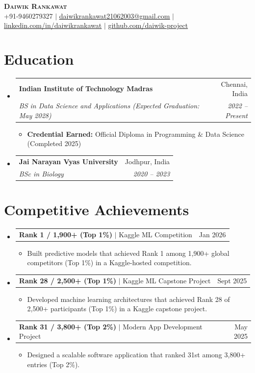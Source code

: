\documentclass[letterpaper,11pt]{article}
\makeatletter
\newcommand{\resumeItem}[1]{
  \item\small{
    {#1 \vspace{-2pt}}
  }
}
\newcommand{\resumeSubheading}[4]{
  \vspace{-2pt}\item
    \begin{tabular*}{0.97\textwidth}[t]{l@{\extracolsep{\fill}}r}
      \textbf{#1} & #2 \\
      \textit{\small#3} & \textit{\small #4} \\
    \end{tabular*}\vspace{-7pt}
}
\newcommand{\resumeProjectHeading}[2]{
    \item
    \begin{tabular*}{0.97\textwidth}{l@{\extracolsep{\fill}}r}
      \small#1 & #2 \\
    \end{tabular*}\vspace{-7pt}
}
\newcommand{\resumeSubHeadingListStart}{\begin{itemize}[leftmargin=0.15in, label={}]}
\newcommand{\resumeSubHeadingListEnd}{\end{itemize}}
\newcommand{\resumeItemListStart}{\begin{itemize}[label=--]}
\newcommand{\resumeItemListEnd}{\end{itemize}\vspace{-5pt}}
\makeatother
\begin{document}
\begin{center}
    \textbf{\Huge \scshape Daiwik Rankawat} \\ \vspace{1pt}
    \small +91-9460279327 $|$ \href{mailto:daiwikrankawat21062003@gmail.com}{\underline{daiwikrankawat21062003@gmail.com}} $|$
    \href{https://linkedin.com/in/daiwikrankawat}{\underline{linkedin.com/in/daiwikrankawat}} $|$
    \href{https://github.com/daiwik-project}{\underline{github.com/daiwik-project}}
\end{center}

\section{Education}
  \resumeSubHeadingListStart
    \resumeSubheading
      {Indian Institute of Technology Madras}{Chennai, India}
      {BS in Data Science and Applications (Expected Graduation: May 2028)}{2022 -- Present}
      \resumeItemListStart
        \resumeItem{\textbf{Credential Earned:} Official Diploma in Programming \& Data Science (Completed 2025)}
      \resumeItemListEnd
    \resumeSubheading
      {Jai Narayan Vyas University}{Jodhpur, India}
      {BSc in Biology}{2020 -- 2023}
  \resumeSubHeadingListEnd

\section{Competitive Achievements}
  \resumeSubHeadingListStart
    \resumeProjectHeading
      {\textbf{Rank 1 / 1,900+ (Top 1\%)} $|$ Kaggle ML Competition}{Jan 2026}
      \resumeItemListStart
        \resumeItem{Built predictive models that achieved Rank 1 among 1,900+ global competitors (Top 1\%) in a Kaggle-hosted competition.}
      \resumeItemListEnd
    \resumeProjectHeading
      {\textbf{Rank 28 / 2,500+ (Top 1\%)} $|$ Kaggle ML Capstone Project}{Sept 2025}
      \resumeItemListStart
        \resumeItem{Developed machine learning architectures that achieved Rank 28 of 2,500+ participants (Top 1\%) in a Kaggle capstone project.}
      \resumeItemListEnd
    \resumeProjectHeading
      {\textbf{Rank 31 / 3,800+ (Top 2\%)} $|$ Modern App Development Project}{May 2025}
      \resumeItemListStart
        \resumeItem{Designed a scalable software application that ranked 31st among 3,800+ entries (Top 2\%).}
      \resumeItemListEnd
  \resumeSubHeadingListEnd
\end{document}
